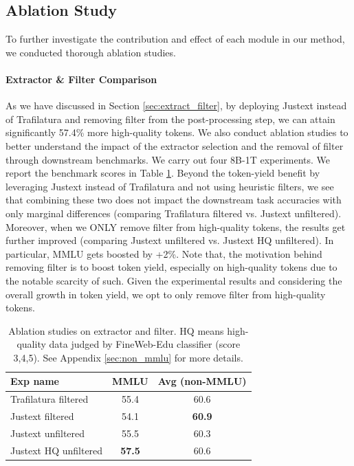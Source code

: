 \documentclass[11pt]{article}
\begin{document}
\subsection{Ablation Study} \label{sec:ablation}
To further investigate the contribution and effect of each module in our method, we conducted thorough ablation studies.

\paragraph{Extractor \& Filter Comparison}

As we have discussed in Section \ref{sec:extract_filter}, by deploying Justext instead of Trafilatura and removing filter from the post-processing step, we can attain significantly 57.4\% more high-quality tokens. We also conduct ablation studies to better understand the impact of the extractor selection and the removal of filter through downstream benchmarks. We carry out four 8B-1T experiments. We report the benchmark scores in Table \ref{table:extactor_filter_ablation}. Beyond the token-yield benefit by leveraging Justext instead of Trafilatura and not using heuristic filters, we see that combining these two does not impact the downstream task accuracies with only marginal differences (comparing Trafilatura filtered vs. Justext unfiltered). Moreover, when we ONLY remove filter from high-quality tokens, the results get further improved (comparing Justext unfiltered vs. Justext HQ unfiltered). In particular, MMLU gets boosted by +2\%. Note that, the motivation behind removing filter is to boost token yield, especially on high-quality tokens due to the notable scarcity of such. Given the experimental results and considering the overall growth in token yield, we opt to only remove filter from high-quality tokens.

\begin{table}[!hbt] \small \centering
\begin{tabularx}{\linewidth}{Xcc}
\toprule
\textbf{Exp name}     & \textbf{MMLU} & \textbf{Avg (non-MMLU)} \\ \midrule
Trafilatura filtered  & 55.4              & 60.6                   \\ 
Justext filtered      & 54.1              & \textbf{60.9}          \\ 
Justext unfiltered    & 55.5              & 60.3                   \\ 
Justext HQ unfiltered & \textbf{57.5}     & 60.6                   \\ \bottomrule
\end{tabularx}
\caption{Ablation studies on extractor and filter. HQ means high-quality data judged by FineWeb-Edu classifier (score 3,4,5). See Appendix \ref{sec:non_mmlu} for more details.}
\label{table:extactor_filter_ablation}
\end{table}
\end{document}
